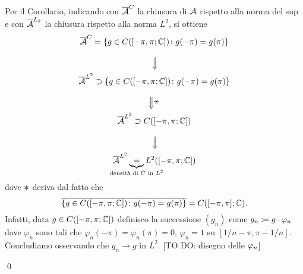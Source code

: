 \begin{enumerate}
		Per il Corollario, indicando con $\overline{\mathcal{A}}^C$ la chiusura di $\mathcal{A}$ rispetto alla norma del sup e con $\overline{\mathcal{A}}^{L_2}$ la chiusura rispetto alla norma $L^2$, si ottiene
		\begin{gather*}
			\ol{\mc{A}}^C = \left\{ g \in C([-\pi,\pi;\C]) \colon g(-\pi) = g(\pi) \right\} \\
			\text{\rotatebox{270}{$\Longrightarrow$}} \\
			\ol{\mc{A}}^{L^2} \supset \left\{ g \in C([-\pi,\pi;\C]) \colon g(-\pi) = g(\pi) \right\} \\
			\text{\rotatebox{270}{$\stackrel{\scalebox{1.2}{$\ast$}}{\Longrightarrow}$}} \\
			\ol{\mc{A}}^{L^2} \supset C([-\pi,\pi;\C]) \\
			\text{\rotatebox{270}{$\Longrightarrow$}} \\
			\ol{\mc{A}}^{L^2} \underbrace{=}_{\mathclap{\text{densità di $C$ in $L^2$}}} L^2([-\pi,\pi;\C])
		\end{gather*}
		dove $\scalebox{1.2}{$\ast$}$ deriva dal fatto che 
		$$
			\overline{\left\{ g \in C([-\pi,\pi;\mathbb C]) \colon g(-\pi) = g(\pi) \right\}}
			= C([-\pi,\pi];\mathbb C).
		$$
		Infatti, data $g \in C([-\pi,\pi;\mathbb C])$ definisco la successione $(g_n)$ come $g_n \coloneqq g \cdot \varphi_n$ dove $\varphi_n$ sono tali che $\varphi_n(-\pi) = \varphi_n(\pi) = 0$, $\varphi_n = 1$ su $[1/n - \pi, \pi - 1/n]$.
		Concludiamo osservando che $g_n \to g$ in $L^2$. [TO DO: disegno delle $\varphi_n$]

		
\qed
\end{enumerate}
